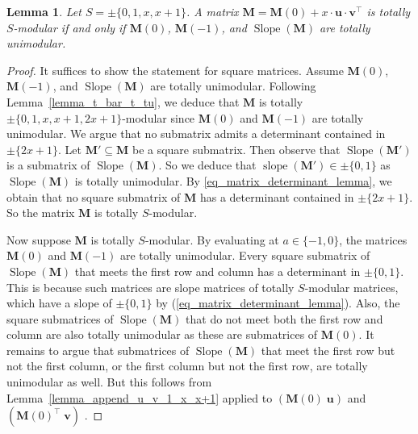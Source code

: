 \documentclass[a4paper, 11pt]{article}
\DeclareMathOperator{\slope}{slope}
\DeclareMathOperator{\slopematrix}{Slope}
\newcommand{\bv}{\bm{v}}
\newcommand{\bu}{\bm{u}}
\newcommand{\bM}{\bm{M}}
\newcommand{\indet}{x}
\newcommand{\intvar}{a}
\newcommand{\polyS}{S}
\newcommand{\polyM}{\bM}
\newtheorem{lemma}{Lemma}
\begin{document}
	\begin{lemma}
		\label{lemma_recognition_characterization_1_x_x+1}
		Let $\polyS = \pm\lbrace 0,1,\indet,\indet + 1\rbrace$. A matrix $\polyM = \bM(0) + \indet \cdot\bu\cdot\bv^\top$ is totally $\polyS$-modular if and only if $\bM(0)$, $\bM(-1)$, and $\slopematrix(\bM)$ are totally unimodular.
	\end{lemma}
	\begin{proof}
		It suffices to show the statement for square matrices. Assume $\bM(0)$, $\bM(-1)$, and $\slopematrix(\bM)$ are totally unimodular. 
		Following Lemma~\ref{lemma_t_bar_t_tu}, we deduce that $\polyM$ is totally $\pm\lbrace 0,1,\indet,\indet + 1, 2\indet + 1\rbrace$-modular since $\bM(0)$ and $\bM(-1)$ are totally unimodular. We argue that no submatrix admits a determinant contained in $\pm\lbrace 2\indet + 1\rbrace$. Let $\polyM'\subseteq \polyM$ be a square submatrix. Then observe that $\slopematrix(\bM')$ is a submatrix of $\slopematrix(\bM)$. So we deduce that $\slope(\bM') \in \pm\lbrace 0,1\rbrace$ as $\slopematrix(\bM)$ is totally unimodular. By \eqref{eq_matrix_determinant_lemma}, we obtain that no square submatrix of $\bM$ has a determinant contained in $\pm\lbrace 2\indet + 1\rbrace$. So the matrix $\polyM$ is totally $\polyS$-modular. 
		
		Now suppose $\polyM$ is totally $\polyS$-modular. By evaluating at $\intvar\in\lbrace -1,0\rbrace$, the matrices $\bM(0)$ and $\bM(-1)$ are totally unimodular. Every square submatrix of $\slopematrix(\bM)$ that meets the first row and column has a determinant in $\pm \lbrace 0,1\rbrace$. This is because such matrices are slope matrices of totally $\polyS$-modular matrices, which have a slope of $\pm \lbrace 0,1\rbrace$ by (\ref{eq_matrix_determinant_lemma}). Also, the square submatrices of $\slopematrix(\bM)$ that do not meet both the first row and column are also totally unimodular as these are submatrices of $\bM(0)$. It remains to argue that submatrices of $\slopematrix(\bM)$ that meet the first row but not the first column, or the first column but not the first row, are totally unimodular as well. But this follows from Lemma~\ref{lemma_append_u_v_1_x_x+1} applied to $(\bM(0) \; \bu)$ and $(\bM(0)^\top \; \bv)$ .
	\end{proof}
	
\end{document}

